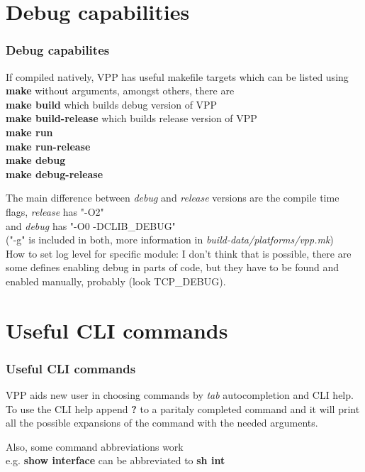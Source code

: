 \documentclass{beamer}
\begin{document}
\section{Debug capabilities}
  \begin{frame}
  \frametitle{Debug capabilites}
  If compiled natively, VPP has useful makefile targets which can be listed using
  \textbf{make} without arguments, amongst others, there are \\
  \textbf{make build} which builds debug version of VPP \\
  \textbf{make build-release} which builds release version of VPP \\
  \textbf{make run} \\
  \textbf{make run-release} \\
  \textbf{make debug} \\
  \textbf{make debug-release}

  The main difference between \textit{debug} and \textit{release} versions
  are the compile time flags, \textit{release} has "-O2" \\ and
  \textit{debug} has "-O0 -DCLIB\_DEBUG" \\ \tiny{("-g" is included in both, more information in \textit{build-data/platforms/vpp.mk})} \\
  {\tiny \color{blue} How to set log level for specific module:} {\tiny \color{red} I don't think that is possible, there are some defines enabling debug in parts of code, but they have to be found and enabled
  manually, probably (look TCP\_DEBUG). }
  \end{frame}
  
\section{Useful CLI commands}
  \begin{frame}
  \frametitle{Useful CLI commands}
  VPP aids new user in choosing commands by \textit{tab} autocompletion and CLI help. \\
  \vspace{1cm}
  To use the CLI help append \textbf{?} to a paritaly completed command
  and it will print all the possible expansions of the command with
  the needed arguments.
  
  \vfill
  
  Also, some command abbreviations work \\
  e.g. \textbf{show interface} can be abbreviated to \textbf{sh int}
  \end{frame}
      
\end{document}
